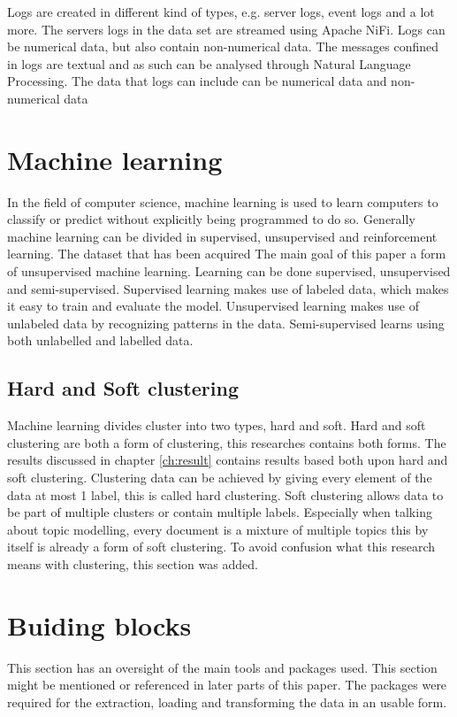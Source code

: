 Logs are created in different kind of types, e.g. server logs, event logs and a lot more. The servers logs in the data set are streamed using Apache NiFi. Logs can be numerical data, but also contain non-numerical data. The messages confined in logs are textual and as such can be analysed through Natural Language Processing.
The data that logs can include can be numerical data and non-numerical data



\section{Machine learning} \label{theory:machinelearning}
In the field of computer science, machine learning is used to learn computers to classify or predict without explicitly being programmed to do so. Generally machine learning can be divided in supervised, unsupervised and reinforcement learning. The dataset that has been acquired 
The main goal of this paper a form of unsupervised machine learning.
Learning can be done supervised, unsupervised and semi-supervised. Supervised learning makes use of labeled data, which makes it easy to train and evaluate the model. Unsupervised learning makes use of unlabeled data by recognizing patterns in the data. Semi-supervised learns using both unlabelled and labelled data.

\subsection{Hard and Soft clustering}
Machine learning divides cluster into two types, hard and soft. Hard and soft clustering are both a form of clustering, this researches contains both forms. The results discussed in chapter \ref{ch:result} contains results based both upon hard and soft clustering. Clustering data can be achieved by giving every element of the data at most 1 label, this is called hard clustering. Soft clustering allows data to be part of multiple clusters or contain multiple labels. Especially when talking about topic modelling, every document is a mixture of multiple topics this by itself is already a form of soft clustering. To avoid confusion what this research means with clustering, this section was added.

\section{Buiding blocks} \label{theory:buildingblocks}
This section has an oversight of the main tools and packages used. This section might be mentioned or referenced in later parts of this paper. The packages were required for the extraction, loading and transforming the data in an usable form.

